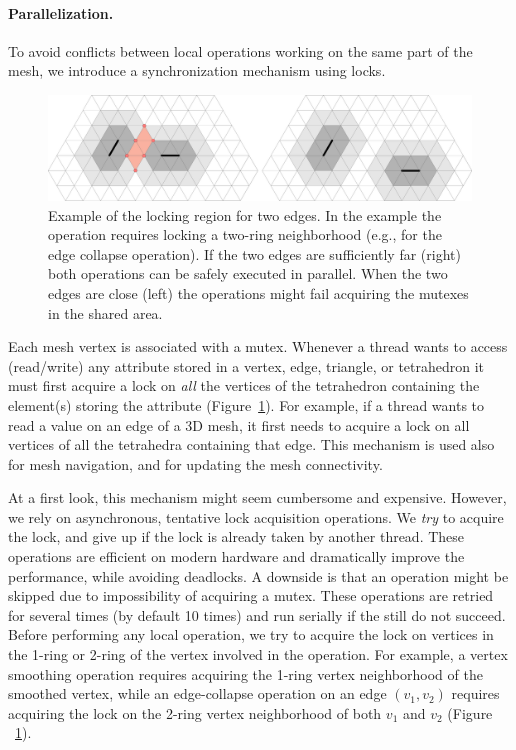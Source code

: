 \paragraph{Parallelization.} To avoid conflicts between local operations working on the same part of the mesh, we introduce a synchronization mechanism using locks. 

\begin{figure}\centering\footnotesize
    \includegraphics[width=\linewidth]{wmtk-tex/figs/lock_illustration}
    \caption{{Example of the locking region for two edges. In the example the operation requires locking a two-ring neighborhood (e.g.,  for the edge collapse operation). If the two edges are sufficiently far (right) both operations can be safely executed in parallel. When the two edges are close (left) the operations might fail acquiring the mutexes in the shared area.}}
    \label{fig:lock-example}
\end{figure}

Each mesh vertex is associated with a mutex. Whenever a thread wants to access (read/write) any attribute stored in a vertex, edge, triangle, or tetrahedron it must first acquire a lock on \emph{all} the vertices of the tetrahedron containing the element(s) storing the attribute (Figure~\ref{fig:lock-example}). For example, if a thread wants to read a value on an edge of a 3D mesh, it first needs to acquire a lock on all vertices of all the tetrahedra containing that edge. This mechanism is used also for mesh navigation, and for updating the mesh connectivity. 

At a first look, this mechanism might seem cumbersome and expensive. However, we rely on asynchronous, tentative lock acquisition operations. We \emph{try} to acquire the lock, and give up if the lock is already taken by another thread. These operations are efficient on modern hardware and dramatically improve the performance, while avoiding deadlocks. A downside is that an operation might be skipped due to impossibility of acquiring a mutex. These operations are retried for several times (by default 10 times) and run serially if the still do not succeed. Before performing any local operation, we try to acquire the lock on vertices in the 1-ring or 2-ring of the vertex involved in the operation. For example, a vertex smoothing operation requires acquiring the 1-ring vertex neighborhood of the smoothed vertex, while an edge-collapse operation on an edge $(v_1, v_2)$ requires acquiring the lock on the 2-ring vertex neighborhood of both $v_1$ and $v_2$
({Figure ~\ref{fig:lock-example}}).

